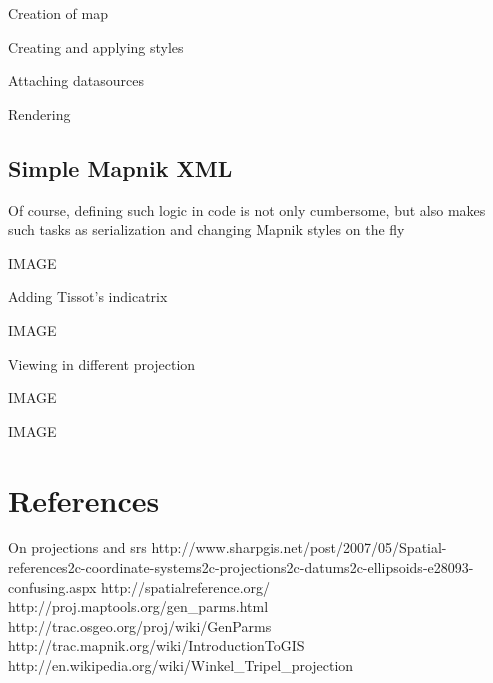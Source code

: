 \documentclass{article}
\begin{document}
Creation of map

Creating and applying styles

Attaching datasources

Rendering

\subsection{Simple Mapnik XML}

Of course, defining such logic in code is not only cumbersome, but also makes
such tasks as serialization and changing Mapnik styles on the fly



IMAGE

Adding Tissot's indicatrix



IMAGE

Viewing in different projection



IMAGE



IMAGE



\section{References}

On projections and srs
http://www.sharpgis.net/post/2007/05/Spatial-references2c-coordinate-systems2c-projections2c-datums2c-ellipsoids-e28093-confusing.aspx
http://spatialreference.org/
http://proj.maptools.org/gen_parms.html
http://trac.osgeo.org/proj/wiki/GenParms
http://trac.mapnik.org/wiki/IntroductionToGIS
http://en.wikipedia.org/wiki/Winkel_Tripel_projection
\end{document}
